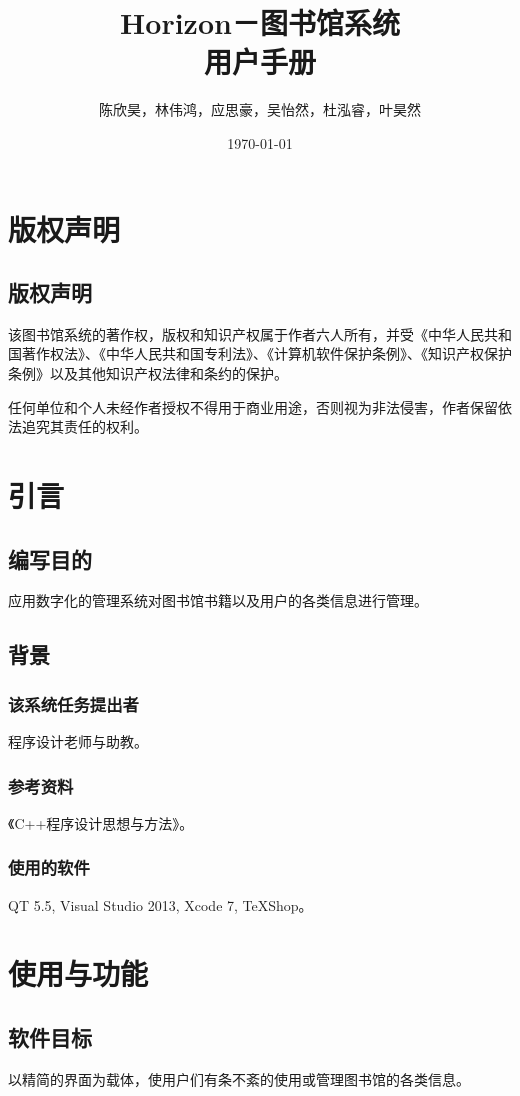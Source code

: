 \documentclass[UTF8]{ctexart}
\title{Horizon－图书馆系统\\用户手册}
\author{陈欣昊，林伟鸿，应思豪，吴怡然，杜泓睿，叶昊然}
\date{\today}
\begin{document}
\maketitle
\newpage
\tableofcontents
\newpage
\section{版权声明}
\subsection{版权声明}
\par
该图书馆系统的著作权，版权和知识产权属于作者六人所有，并受《中华人民共和国著作权法》、《中华人民共和国专利法》、《计算机软件保护条例》、《知识产权保护条例》以及其他知识产权法律和条约的保护。
\par
任何单位和个人未经作者授权不得用于商业用途，否则视为非法侵害，作者保留依法追究其责任的权利。
\section{引言}
\subsection{编写目的}
\par	
应用数字化的管理系统对图书馆书籍以及用户的各类信息进行管理。
\subsection{背景}
\subsubsection{该系统任务提出者}
\par
程序设计老师与助教。
\subsubsection{参考资料}
\par
《C++程序设计思想与方法》。
\subsubsection{使用的软件}
\par
QT 5.5, Visual Studio 2013, Xcode 7, TeXShop。
\section{使用与功能}
\subsection{软件目标}
\par
以精简的界面为载体，使用户们有条不紊的使用或管理图书馆的各类信息。
\end{document}
